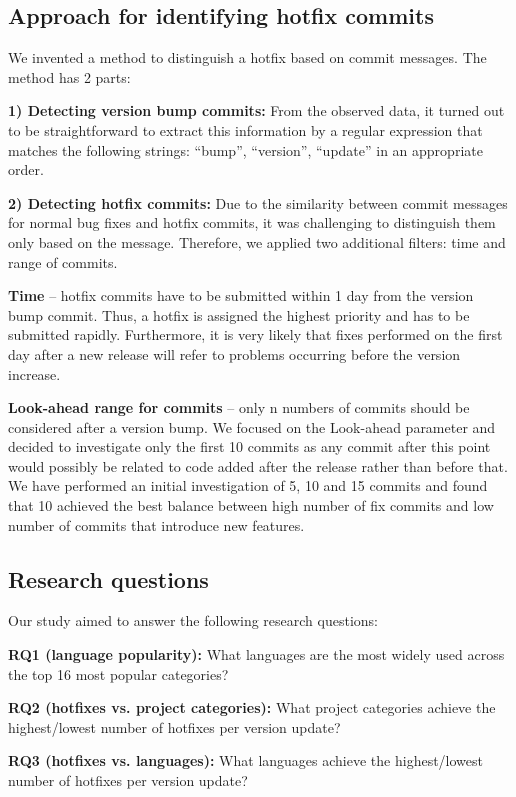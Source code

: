\documentclass{sig-alternate}
\begin{document}
\subsection{Approach for identifying hotfix commits}
We invented a method to distinguish a hotfix based on commit messages. The method has 2 parts:

\textbf{1) Detecting version bump commits:} From the observed data, it turned out to be straightforward to extract this information by a regular expression that matches the following strings: ``bump'', ``version'', ``update'' in an appropriate order.

\textbf{2) Detecting hotfix commits:} Due to the similarity between commit messages for normal bug fixes and hotfix commits, it was challenging to distinguish them only based on the message. Therefore, we applied two additional filters: time and range of commits.

\textbf{Time} -- hotfix commits have to be submitted within 1 day from the version bump commit. Thus, a hotfix is assigned the highest priority and has to be submitted rapidly. Furthermore, it is very likely that fixes performed on the first day after a new release will refer to problems occurring before the version increase.

\textbf{Look-ahead range for commits} -- only n numbers of commits should be considered after a version bump. We focused on the Look-ahead parameter and decided to investigate only the first 10 commits as any commit after this point would possibly be related to code added after the release rather than before that. We have performed an initial investigation of 5, 10 and 15 commits and found that 10 achieved the best balance between high number of fix commits and low number of commits that introduce new features.

\subsection{Research questions}
\noindent Our study aimed to answer the following research questions:

\noindent\textbf{RQ1 (language popularity):} What languages are the most widely used across the top 16 most popular categories?

\noindent\textbf{RQ2 (hotfixes vs. project categories):} What project categories achieve the highest/lowest number of hotfixes per version update?

\noindent\textbf{RQ3 (hotfixes vs. languages):} What languages achieve the highest/lowest number of hotfixes per version update?
\end{document}
